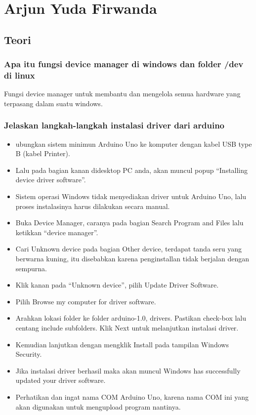 \section{Arjun Yuda Firwanda}
\subsection{Teori}
\subsubsection{Apa itu fungsi device manager di windows dan folder /dev di linux}
Fungsi device manager untuk membantu dan mengelola semua hardware yang terpasang dalam suatu windows.

\subsubsection{Jelaskan langkah-langkah instalasi driver dari arduino}
\begin{itemize}
    \item ubungkan sistem minimun Arduino Uno ke komputer dengan kabel USB type B (kabel Printer).
    \item Lalu pada bagian kanan didesktop PC anda, akan muncul popup “Installing device driver software”.
	\item Sistem operasi Windows tidak menyediakan driver untuk Arduino Uno, lalu proses instalasinya harus dilakukan secara manual.
	\item Buka Device Manager, caranya pada bagian Search Program and Files lalu ketikkan “device manager”.
	\item Cari Unknown device pada bagian Other device, terdapat tanda seru yang berwarna kuning, itu disebabkan karena penginstallan tidak berjalan dengan sempurna.
	\item Klik kanan pada “Unknown device”, pilih Update Driver Software.
    \item Pilih Browse my computer for driver software.
	\item Arahkan lokasi folder ke folder arduino-1.0, drivers. Pastikan check-box lalu centang include subfolders. Klik Next untuk melanjutkan instalasi driver.
	\item Kemudian lanjutkan dengan mengklik Install pada tampilan Windows Security.
	\item Jika instalasi driver berhasil maka akan muncul Windows has successfully updated your driver software.
	\item Perhatikan dan ingat nama COM Arduino Uno, karena nama COM ini yang akan digunakan untuk mengupload program nantinya.
\end{itemize}

